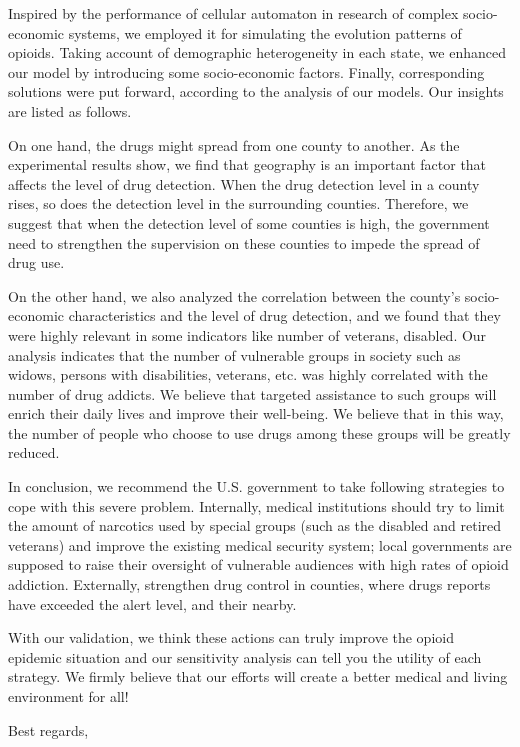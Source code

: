 \documentclass[a4paper]{article}
\begin{document}
\textsf{Inspired by the performance of cellular automaton in research of complex socio-economic systems, we employed it for simulating the evolution patterns of opioids. Taking account of demographic heterogeneity in each state, we enhanced our model by introducing some socio-economic factors. Finally, corresponding solutions were put forward, according to the analysis of our models. Our insights are listed as follows.}

\textsf{On one hand, the drugs might spread from one county to another. As the experimental results show, we find that geography is an important factor that affects the level of drug detection. When the drug detection level in a county rises, so does the detection level in the surrounding counties. Therefore, we suggest that when the detection level of some counties is high, the government need to strengthen the supervision on these counties to impede the spread of drug use.}

\textsf{On the other hand, we also analyzed the correlation between the county's socio-economic characteristics and the level of drug detection, and we found that they were highly relevant in some indicators like number of veterans, disabled. Our analysis indicates that the number of vulnerable groups in society such as widows, persons with disabilities, veterans, etc. was highly correlated with the number of drug addicts. We believe that targeted assistance to such groups will enrich their daily lives and improve their well-being. We believe that in this way, the number of people who choose to use drugs among these groups will be greatly reduced.}

\textsf{In conclusion, we recommend the U.S. government to take following strategies to cope with this severe problem. Internally, medical institutions should try to limit the amount of narcotics used by special groups (such as the disabled and retired veterans) and improve the existing medical security system; local governments are supposed to raise their oversight of vulnerable audiences with high rates of opioid addiction. Externally, strengthen drug control in counties, where drugs reports have exceeded the alert level, and their nearby.}

\textsf{With our validation, we think these actions can truly improve the opioid epidemic situation and our sensitivity analysis can tell you the utility of each strategy. We firmly believe that our efforts will create a better medical and living environment for all!}

\noindent \textsf{Best regards,}
\end{document}
